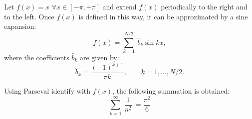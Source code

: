 Let $ f(x) = x $ $ \forall x \in [-\pi, +\pi ] $ and extend $ f(x) $  periodically to the right and to the left. Once $ f(x) $ is defined in 
this way, it can be approximated by a sine expansion: 
\begin{equation} 
	f ( x)  =  \sum_{k=1} ^{N/2} \   \hat{b}_k  \sin k x, 
\end{equation} 
where the coefficients $ \hat{b}_k $ are given by:
\begin{equation} 
	\hat{b}_k   = \frac{ (-1)^{k+1} }{ \pi k }, \qquad k=1, \ldots, N/2. 
\end{equation} 

Using Parseval identify with $ f(x)$, the following  summation is obtained: 
\begin{equation} 
	\sum_{k=1} ^{\infty} \  \frac{1}{n^2}  \  = \frac{\pi^2}{6}
\end{equation} 


